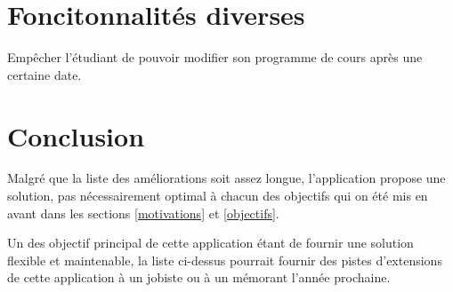 \section{Foncitonnalités diverses}
Empêcher l'étudiant de pouvoir modifier son programme de cours après une certaine date. 
\section{Conclusion}
Malgré que la liste des améliorations soit assez longue, l'application propose une solution, pas nécessairement optimal à chacun des objectifs qui on été mis en avant dans les sections \ref{motivations} et \ref{objectifs}.

Un des objectif principal de cette application étant de fournir une solution flexible et maintenable, la liste ci-dessus pourrait fournir des pistes d'extensions de cette application à un jobiste ou à un mémorant l'année prochaine.  



